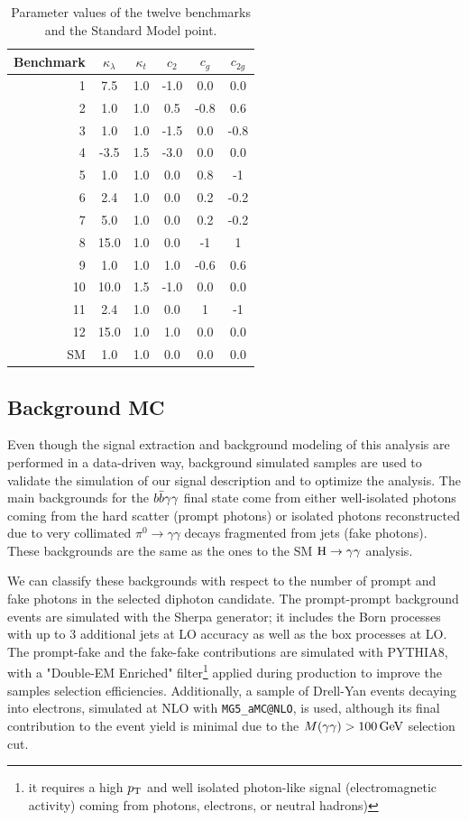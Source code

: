  \begin{table}[h]
\centering
\small{
\begin{tabular}{rccccc}
\hline
Benchmark & $\kappa_{\lambda}$ & $\kappa_{t}$ & $c_{2}$	& $c_{g}$ & $c_{2g}$ \\\hline
1 &	7.5	 & 1.0	 &	-1.0	& 0.0	& 0.0 \\
2 &	1.0	 & 1.0	 &	0.5		& -0.8	& 0.6 \\
3 &	1.0	 & 1.0	 &	-1.5	& 0.0	& -0.8 \\
4 &	-3.5 & 1.5  &	-3.0	& 0.0	& 0.0 \\
5 &	1.0	 & 1.0	 &	0.0		& 0.8	& -1 \\
6 &	2.4	 & 1.0	 &	0.0		& 0.2	& -0.2 \\
7 &	5.0	 & 1.0	 &	0.0		& 0.2	& -0.2 \\
8 &	15.0 & 1.0	 &	0.0		& -1	& 1 \\
9 &	1.0	 & 1.0	 &	1.0		& -0.6	& 0.6 \\
10 &	10.0 & 1.5   &	-1.0	& 0.0	& 0.0 \\
11 &	2.4	 & 1.0	 &	0.0		& 1		& -1 \\
12 &	15.0 & 1.0	 &	1.0		& 0.0	& 0.0 \\ \hline %
SM &	1.0 & 1.0	 &	0.0		& 0.0	& 0.0 \\
\hline
\end{tabular}
}
\caption{\small Parameter values of the twelve benchmarks and the Standard Model point.  \label{tab:bench}}
\end{table}
 
 \subsection{Background MC}

Even though the signal extraction and background modeling of this analysis are performed in a data-driven way, background simulated samples are used to validate the simulation of our signal description and to optimize the analysis. 
The main backgrounds for the $b\bar{b}\gamma\gamma $ final state come from either well-isolated photons coming from the hard scatter (prompt photons) or isolated photons reconstructed due to very collimated $\pi^{0}\to\gamma\gamma$ decays fragmented from jets (fake photons). 
These backgrounds are the same as the ones to the SM $\mathrm{H}\to\gamma\gamma$ analysis.

We can classify these backgrounds with respect to the number of prompt and fake photons in the selected diphoton candidate. The prompt-prompt background events are simulated with the Sherpa generator; it includes the Born processes with up to 3 additional jets at LO accuracy as well as the box processes at LO. 
The prompt-fake and the fake-fake contributions are simulated with PYTHIA8, with a "Double-EM Enriched" filter\footnote{it requires a high $p_{\mathrm{T}}$ and well isolated photon-like signal (electromagnetic activity) coming from photons, electrons, or neutral hadrons)} applied during production to improve the samples selection efficiencies. 
Additionally, a sample of Drell-Yan events decaying into electrons, simulated at NLO with {\tt MG5\_aMC@NLO}, is used, although its final contribution to the event yield is minimal due to the $M(\gamma\gamma) > 100 \,\text{Ge\hspace{-.08em}V}$ selection cut.

